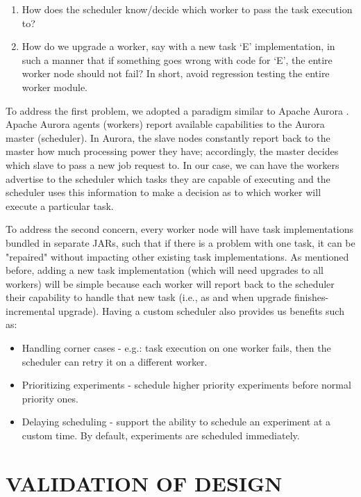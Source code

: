 \documentclass[sigconf]{acmart}
\begin{document}
\begin{enumerate}
\item How does the scheduler know/decide which worker to pass the task execution to?
\item How do we upgrade a worker, say with a new task \lq{E}\rq{} implementation, in such a manner that if something goes wrong with code for \lq{E}\rq{}, the entire worker node should not fail? In short, avoid regression testing the entire worker module.
\end{enumerate}

To address the first problem, we adopted a paradigm similar to Apache Aurora \cite{apacheAurora}.  Apache Aurora agents (workers) report available capabilities to the Aurora master (scheduler). In Aurora, the slave nodes constantly report back to the master how much processing power they have; accordingly, the master decides which slave to pass a new job request to. In our case, we can have the workers advertise to the scheduler which tasks they are capable of executing and the scheduler uses this information to make a decision as to which worker will execute a particular task. \newline

To address the second concern, every worker node will have task implementations bundled in separate JARs, such that if there is a problem with one task, it can be "repaired" without impacting other existing task implementations. As mentioned before, adding a new task implementation (which will need upgrades to all workers) will be simple because each worker will report back to the scheduler their capability to handle that new task (i.e., as and when upgrade finishes-incremental upgrade). Having a custom scheduler also provides us benefits such as:

\begin{itemize}
\item Handling corner cases - e.g.: task execution on one worker fails, then the scheduler can retry it on a different worker.
\item Prioritizing experiments - schedule higher priority experiments before normal priority ones.
\item Delaying scheduling - support the ability to schedule an experiment at a custom time. By default, experiments are scheduled immediately.
\end{itemize}

\section{VALIDATION OF DESIGN}
\end{document}
